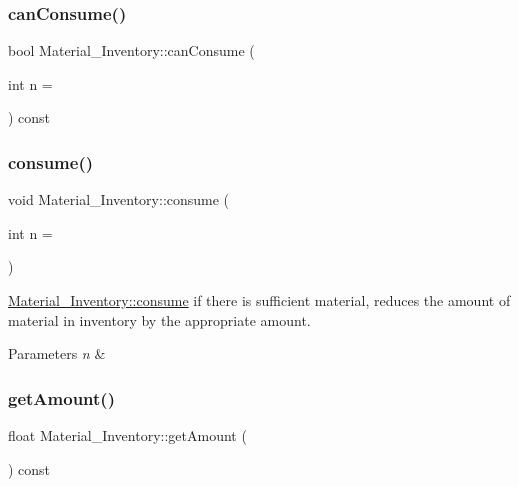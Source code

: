 \subsubsection{\texorpdfstring{can\+Consume()}{canConsume()}}
{\footnotesize\ttfamily bool Material\+\_\+\+Inventory\+::can\+Consume (\begin{DoxyParamCaption}\item[{int}]{n = {} }\end{DoxyParamCaption}) const}

\mbox{\label{classMaterial__Inventory_a8c281edc32968e93c0a820ed29ccf3d5}} 
\subsubsection{\texorpdfstring{consume()}{consume()}}
{\footnotesize\ttfamily void Material\+\_\+\+Inventory\+::consume (\begin{DoxyParamCaption}\item[{int}]{n = {} }\end{DoxyParamCaption})}



\hyperlink{classMaterial__Inventory_a8c281edc32968e93c0a820ed29ccf3d5}{Material\+\_\+\+Inventory\+::consume} if there is sufficient material, reduces the amount of material in inventory by the appropriate amount. 


\begin{DoxyParams}{Parameters}
{\em n} & \\
\hline
\end{DoxyParams}
\mbox{\label{classMaterial__Inventory_acc6a2d2b8dc613689561b0165d591fb1}} 
\subsubsection{\texorpdfstring{get\+Amount()}{getAmount()}}
{\footnotesize\ttfamily float Material\+\_\+\+Inventory\+::get\+Amount (\begin{DoxyParamCaption}{ }\end{DoxyParamCaption}) const}



